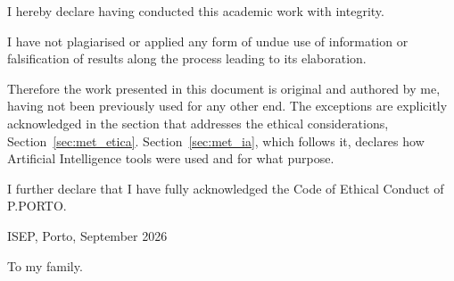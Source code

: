 
\frontmatter
\pagestyle{plain}

\maketitlepage


\begin{soi}

\vspace{1cm}

I hereby declare having conducted this academic work with integrity.

I have not plagiarised or applied any form of undue use of information or falsification of
results along the process leading to its elaboration.

Therefore the work presented in this document is original and authored by me, having not been
previously used for any other end. The exceptions are explicitly acknowledged in the section
that addresses the ethical considerations, Section~\ref{sec:met_etica}.
Section~\ref{sec:met_ia}, which follows it, declares how Artificial Intelligence tools were
used and for what purpose.

I further declare that I have fully acknowledged the Code of Ethical Conduct of P.PORTO.

\vspace{1cm}

ISEP, Porto, September 2026

\end{soi}

\begin{dedicatory}
To my family.
\end{dedicatory}

